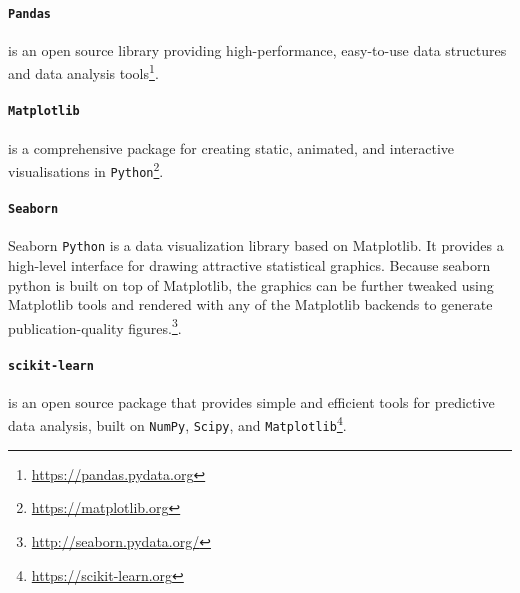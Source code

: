 \paragraph*{\texttt{Pandas}} is an open source library providing high-performance, easy-to-use data structures and data analysis tools\footnote{\url{https://pandas.pydata.org}}.

\paragraph*{\texttt{Matplotlib}} is a comprehensive package for creating static, animated, and interactive visualisations in \texttt{Python}\footnote{\url{https://matplotlib.org}}.

\paragraph*{\texttt{Seaborn}} Seaborn \texttt{Python} is a data visualization library based on Matplotlib. It provides a high-level interface for drawing attractive statistical graphics. Because seaborn python is built on top of Matplotlib, the graphics can be further tweaked using Matplotlib tools and rendered with any of the Matplotlib backends to generate publication-quality figures.\footnote{\url{http://seaborn.pydata.org/}}.

\paragraph*{\texttt{scikit-learn}} is an open source package that provides simple and efficient tools for predictive data analysis, built on \texttt{NumPy}, \texttt{Scipy}, and \texttt{Matplotlib}\footnote{\url{https://scikit-learn.org}}.